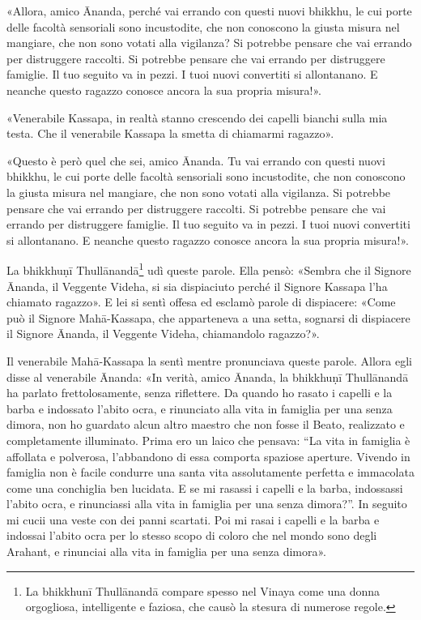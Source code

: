 «Allora, amico Ānanda, perché vai errando con questi nuovi bhikkhu, le
cui porte delle facoltà sensoriali sono incustodite, che non conoscono
la giusta misura nel mangiare, che non sono votati alla vigilanza? Si
potrebbe pensare che vai errando per distruggere raccolti. Si potrebbe
pensare che vai errando per distruggere famiglie. Il tuo seguito va in
pezzi. I tuoi nuovi convertiti si allontanano. E neanche questo ragazzo
conosce ancora la sua propria misura!».


«Venerabile Kassapa, in realtà stanno crescendo dei capelli bianchi sulla
mia testa. Che il venerabile Kassapa la smetta di chiamarmi ragazzo».


«Questo è però quel che sei, amico Ānanda. Tu vai errando con questi
nuovi bhikkhu, le cui porte delle facoltà sensoriali sono incustodite,
che non conoscono la giusta misura nel mangiare, che non sono votati
alla vigilanza. Si potrebbe pensare che vai errando per distruggere
raccolti. Si potrebbe pensare che vai errando per distruggere famiglie.
Il tuo seguito va in pezzi. I tuoi nuovi convertiti si allontanano. E
neanche questo ragazzo conosce ancora la sua propria misura!».


La bhikkhuṇī Thullānandā\footnote{La bhikkhunī Thullānandā compare spesso nel Vinaya come una donna orgogliosa, intelligente e faziosa, che causò la stesura di numerose regole.} udì queste parole. Ella pensò:
«Sembra che il Signore Ānanda, il Veggente Videha, si sia dispiaciuto
perché il Signore Kassapa l’ha chiamato ragazzo». E lei si sentì offesa
ed esclamò parole di dispiacere: «Come può il Signore Mahā-Kassapa, che
apparteneva a una setta, sognarsi di dispiacere il Signore Ānanda, il
Veggente Videha, chiamandolo ragazzo?».


Il venerabile Mahā-Kassapa la sentì mentre pronunciava queste parole.
Allora egli disse al venerabile Ānanda: «In verità, amico Ānanda, la
bhikkhuṇī Thullānandā ha parlato frettolosamente, senza riflettere. Da
quando ho rasato i capelli e la barba e indossato l’abito ocra, e
rinunciato alla vita in famiglia per una senza dimora, non ho guardato
alcun altro maestro che non fosse il Beato, realizzato e completamente
illuminato. Prima ero un laico che pensava: “La vita in famiglia è
affollata e polverosa, l’abbandono di essa comporta spaziose aperture.
Vivendo in famiglia non è facile condurre una santa vita assolutamente
perfetta e immacolata come una conchiglia ben lucidata. E se mi rasassi
i capelli e la barba, indossassi l’abito ocra, e rinunciassi alla vita
in famiglia per una senza dimora?”. In seguito mi cucii una veste con
dei panni scartati. Poi mi rasai i capelli e la barba e indossai l’abito
ocra per lo stesso scopo di coloro che nel mondo sono degli Arahant, e
rinunciai alla vita in famiglia per una senza dimora».


